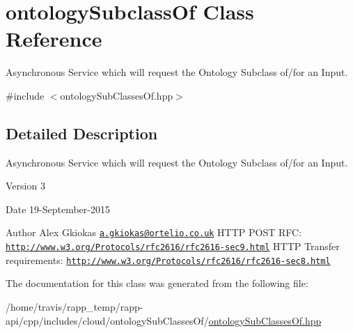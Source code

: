 \hypertarget{classontologySubclassOf}{\section{ontology\-Subclass\-Of Class Reference}
\label{classontologySubclassOf}
}


Asynchronous Service which will request the Ontology Subclass of/for an Input.  




{\ttfamily \#include $<$ontology\-Sub\-Classes\-Of.\-hpp$>$}



\subsection{Detailed Description}
Asynchronous Service which will request the Ontology Subclass of/for an Input. 

\begin{DoxyVersion}{Version}
3 
\end{DoxyVersion}
\begin{DoxyDate}{Date}
19-\/\-September-\/2015 
\end{DoxyDate}
\begin{DoxyAuthor}{Author}
Alex Gkiokas \href{mailto:a.gkiokas@ortelio.co.uk}{\tt a.\-gkiokas@ortelio.\-co.\-uk} H\-T\-T\-P P\-O\-S\-T R\-F\-C\-: \href{http://www.w3.org/Protocols/rfc2616/rfc2616-sec9.html}{\tt http\-://www.\-w3.\-org/\-Protocols/rfc2616/rfc2616-\/sec9.\-html} H\-T\-T\-P Transfer requirements\-: \href{http://www.w3.org/Protocols/rfc2616/rfc2616-sec8.html}{\tt http\-://www.\-w3.\-org/\-Protocols/rfc2616/rfc2616-\/sec8.\-html} 
\end{DoxyAuthor}


The documentation for this class was generated from the following file\-:\begin{DoxyCompactItemize}
\item 
/home/travis/rapp\-\_\-temp/rapp-\/api/cpp/includes/cloud/ontology\-Sub\-Classes\-Of/\hyperlink{ontologySubClassesOf_8hpp}{ontology\-Sub\-Classes\-Of.\-hpp}\end{DoxyCompactItemize}
